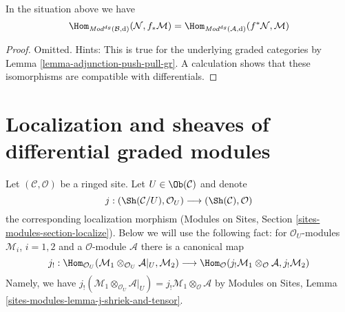 \begin{lemma}
\label{lemma-adjunction-push-pull-dg}
In the situation above we have
$$
\Hom_{\textit{Mod}^{dg}(\mathcal{B}, \text{d})}(
\mathcal{N}, f_*\mathcal{M}) =
\Hom_{\textit{Mod}^{dg}(\mathcal{A}, \text{d})}(
f^*\mathcal{N}, \mathcal{M})
$$
\end{lemma}

\begin{proof}
Omitted. Hints: This is true for the underlying graded categories
by Lemma \ref{lemma-adjunction-push-pull-gr}. A calculation shows
that these isomorphisms are compatible with differentials.
\end{proof}















\section{Localization and sheaves of differential graded modules}
\label{section-localize-dg}

\noindent
Let $(\mathcal{C}, \mathcal{O})$ be a ringed site.
Let $U \in \Ob(\mathcal{C})$ and denote
$$
j :
(\Sh(\mathcal{C}/U), \mathcal{O}_U)
\longrightarrow
(\Sh(\mathcal{C}), \mathcal{O})
$$
the corresponding localization morphism
(Modules on Sites, Section \ref{sites-modules-section-localize}).
Below we will use the following fact: for $\mathcal{O}_U$-modules
$\mathcal{M}_i$, $i = 1, 2$ and a $\mathcal{O}$-module $\mathcal{A}$
there is a canonical map
$$
j_! :
\Hom_{\mathcal{O}_U}(
\mathcal{M}_1 \otimes_{\mathcal{O}_U} \mathcal{A}|_U, \mathcal{M}_2)
\longrightarrow
\Hom_\mathcal{O}(
j_!\mathcal{M}_1 \otimes_\mathcal{O} \mathcal{A}, j_!\mathcal{M}_2)
$$
Namely, we have
$j_!(\mathcal{M}_1 \otimes_{\mathcal{O}_U} \mathcal{A}|_U) =
j_!\mathcal{M}_1 \otimes_\mathcal{O} \mathcal{A}$ by
Modules on Sites, Lemma \ref{sites-modules-lemma-j-shriek-and-tensor}.

